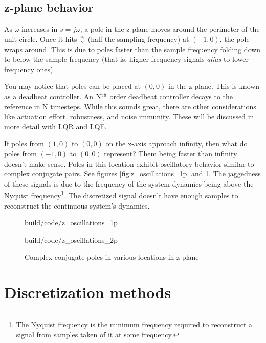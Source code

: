 \subsection{z-plane behavior}

As $\omega$ increases in $s = j\omega$, a pole in the z-plane moves around the
perimeter of the unit circle. Once it hits $\frac{\omega_s}{2}$ (half the
sampling frequency) at $(-1, 0)$, the pole wraps around. This is due to poles
faster than the sample frequency folding down to below the sample frequency
(that is, higher frequency signals \textit{alias} to lower frequency ones).

You may notice that poles can be placed at $(0, 0)$ in the z-plane. This is
known as a deadbeat controller. An $\rm N^{th}$ order deadbeat controller decays
to the \gls{reference} in N timesteps. While this sounds great, there are other
considerations like actuation effort, \gls{robustness}, and
\gls{noise immunity}. These will be discussed in more detail with LQR and LQE.

If poles from $(1, 0)$ to $(0, 0)$ on the x-axis approach infinity, then what do
poles from $(-1, 0)$ to $(0, 0)$ represent? Them being faster than infinity
doesn't make sense. Poles in this location exhibit oscillatory behavior similar
to complex conjugate pairs. See figures \ref{fig:z_oscillations_1p} and
\ref{fig:z_oscillations_2p}. The jaggedness of these signals is due to the
frequency of the system dynamics being above the Nyquist frequency\footnote{The
Nyquist frequency is the minimum frequency required to reconstruct a signal from
samples taken of it at some frequency.}. The discretized signal doesn't have
enough samples to reconstruct the continuous system's dynamics.

\begin{figure}
  \begin{minisvg}{build/code/z_oscillations_1p}
    \caption{Single poles in various locations in z-plane}
    \label{fig:z_oscillations_1p}
  \end{minisvg}
  \hfill
  \begin{minisvg}{build/code/z_oscillations_2p}
    \caption{Complex conjugate poles in various locations in z-plane}
    \label{fig:z_oscillations_2p}
  \end{minisvg}
\end{figure}

\section{Discretization methods}

